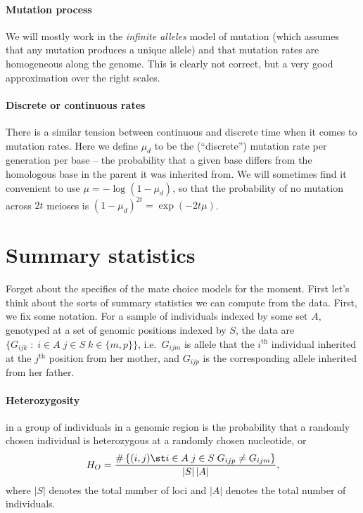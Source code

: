 \paragraph{Mutation process}
  We will mostly work in the \emph{infinite alleles} model of mutation
  (which assumes that any mutation produces a unique allele)
  and that mutation rates are homogeneous along the genome.
  This is clearly not correct, but a very good approximation over the right scales.


\paragraph{Discrete or continuous rates}
  There is a similar tension between continuous and discrete time when it comes to mutation rates.
  Here we define $\mu_d$ to be the (``discrete'') mutation rate per generation per base 
  -- the probability that a given base differs from the homologous base in the parent it was inherited from.
  We will sometimes find it convenient to use $\mu = -\log(1-\mu_d)$,
  so that the probability of no mutation across $2t$ meioses is $(1-\mu_d)^{2t} = \exp(-2 t \mu )$.

\section{Summary statistics}

Forget about the specifics of the mate choice models for the moment.
First let's think about the sorts of summary statistics we can compute from the data.
First, we fix some notation.
For a sample of individuals indexed by some set $A$,
genotyped at a set of genomic positions indexed by $S$,
the data are $\{G_{ijk} \; : \; i \in A \; j \in S \; k \in \{m,p\} \}$,
i.e.\ $G_{ijm}$ is allele that the $i^\mathrm{th}$ individual inherited at the $j^\mathrm{th}$ position from her mother,
and $G_{ijp}$ is the corresponding allele inherited from her father.


\paragraph{Heterozygosity} in a group of individuals in a genomic region 
is the probability that a randomly chosen individual is heterozygous at a randomly chosen nucleotide,
or 
\begin{align}
  H_O = \frac{ \# \left\{ (i,j) \st i \in A \; j \in S \; G_{ijp} \neq G_{ijm} \right\} }{ |S|\,|A| } ,
\end{align}
where $|S|$ denotes the total number of loci and $|A|$ denotes the total number of individuals.

